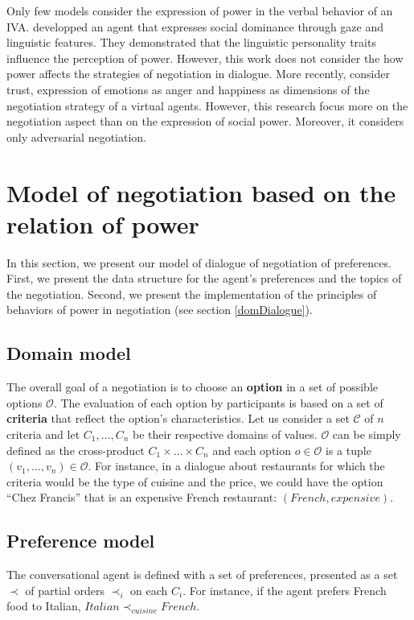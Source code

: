 \documentclass{llncs}
\begin{document}
	Only few models consider the expression of power in the verbal behavior of an IVA. \cite{bee2010bossy} developped an agent that expresses social dominance through gaze and linguistic features. They demonstrated that the linguistic personality traits influence the perception of power. However, this work does not consider the how power affects the strategies of negotiation in dialogue. More recently, \cite{traum2008multi,de2011effect,de2015humans}consider trust, expression of emotions as anger and happiness as dimensions of the negotiation strategy of a virtual agents. However, this research focus more on the negotiation aspect than on the expression of social power. Moreover, it considers only adversarial negotiation.
	
	
	\section{Model of negotiation based on the relation of power}
	In this section, we present our model of dialogue of negotiation of preferences.	
	First, we present the data structure for the agent's preferences and the topics of the negotiation. Second, we present the implementation of the principles of behaviors of power in negotiation (see section \ref{domDialogue}).
	\vspace{-1em} 
	\subsection{Domain model}
	The overall goal of a negotiation is to choose an \textbf{option} in a set of possible options $\mathcal{O}$. The evaluation of each option by participants is based on a set of \textbf{criteria} that reflect the option's characteristics. Let us consider a set $\mathcal{C}$ of $n$ criteria and let $C_1,\ldots,C_n$ be their respective domains of values. $\mathcal{O}$ can be simply defined as the cross-product $C_1\times\ldots\times C_n$ and each option $o\in\mathcal{O}$ is a tuple $(v_1,\ldots,v_n)\in\mathcal{O}$. For instance, in a dialogue about restaurants for which the criteria would be the type of cuisine and the price, we could have the option ``Chez Francis'' that is an expensive French restaurant: $(French,expensive)$.
	
	\subsection{Preference model} 
	The conversational agent is defined with a set of preferences, presented as a set $\prec$ of partial orders $\prec_i$ on each $C_i$. For instance, if the agent prefers French food to Italian, $Italian\prec_{cuisine}French$.
	
\end{document}
